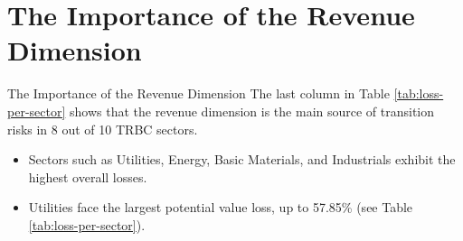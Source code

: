 \documentclass{beamer}
\begin{document}
\section{The Importance of the Revenue Dimension}
\begin{frame}{The Importance of the Revenue Dimension}
  The last column in Table \ref{tab:loss-per-sector} shows that the revenue dimension is the main source of transition risks in 8 out of 10 TRBC sectors.
  \begin{itemize}
    \item Sectors such as Utilities, Energy, Basic Materials, and Industrials exhibit the highest overall losses.
    \item Utilities face the largest potential value loss, up to 57.85\% (see Table \ref{tab:loss-per-sector}).
  \end{itemize}
\end{frame}
\end{document}
